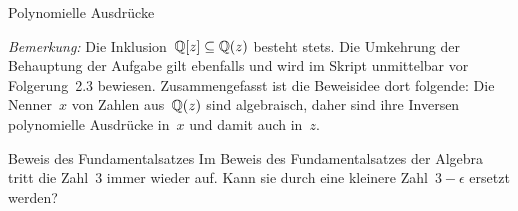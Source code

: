 \documentclass{algblatt}
\begin{document}
\begin{aufgabe}{Polynomielle Ausdrücke}
\begin{loesungE}
\emph{Bemerkung:} Die Inklusion~$\mathbb{Q}[z] \subseteq \mathbb{Q}(z)$ besteht stets. Die
Umkehrung der Behauptung der Aufgabe gilt ebenfalls und wird im Skript
unmittelbar vor Folgerung~2.3 bewiesen. Zusammengefasst ist die Beweisidee
dort folgende: Die Nenner~$x$ von Zahlen aus~$\mathbb{Q}(z)$ sind algebraisch, daher sind
ihre Inversen polynomielle Ausdrücke in~$x$ und damit auch in~$z$.
\end{loesungE}
\end{aufgabe}

\begin{aufgabe}{Beweis des Fundamentalsatzes}
Im Beweis des Fundamentalsatzes der Algebra tritt die Zahl~3 immer wieder auf.
Kann sie durch eine kleinere Zahl~$3-\epsilon$ ersetzt werden?
\end{aufgabe}
\end{document}
